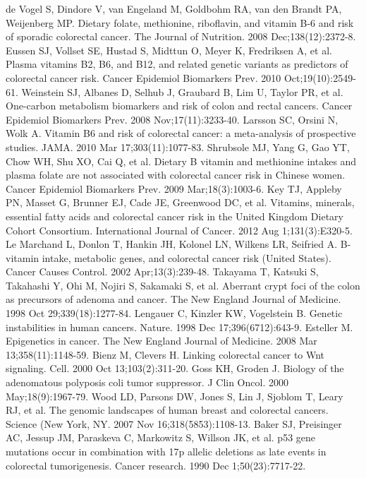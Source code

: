 \begin{thebibliography}{12}
		de Vogel S, Dindore V, van Engeland M, Goldbohm RA, van den Brandt PA, Weijenberg MP. Dietary folate, methionine, riboflavin, and vitamin B-6 and risk of sporadic colorectal cancer. The Journal of Nutrition. 2008 Dec;138(12):2372-8. 
		Eussen SJ, Vollset SE, Hustad S, Midttun O, Meyer K, Fredriksen A, et al. Plasma vitamins B2, B6, and B12, and related genetic variants as predictors of colorectal cancer risk. Cancer Epidemiol Biomarkers Prev. 2010 Oct;19(10):2549-61. 
		Weinstein SJ, Albanes D, Selhub J, Graubard B, Lim U, Taylor PR, et al. One-carbon metabolism biomarkers and risk of colon and rectal cancers. Cancer Epidemiol Biomarkers Prev. 2008 Nov;17(11):3233-40. 
		Larsson SC, Orsini N, Wolk A. Vitamin B6 and risk of colorectal cancer: a meta-analysis of prospective studies. JAMA. 2010 Mar 17;303(11):1077-83. 
		Shrubsole MJ, Yang G, Gao YT, Chow WH, Shu XO, Cai Q, et al. Dietary B vitamin and methionine intakes and plasma folate are not associated with colorectal cancer risk in Chinese women. Cancer Epidemiol Biomarkers Prev. 2009 Mar;18(3):1003-6. 
		Key TJ, Appleby PN, Masset G, Brunner EJ, Cade JE, Greenwood DC, et al. Vitamins, minerals, essential fatty acids and colorectal cancer risk in the United Kingdom Dietary Cohort Consortium. International Journal of Cancer. 2012 Aug 1;131(3):E320-5. 
		Le Marchand L, Donlon T, Hankin JH, Kolonel LN, Wilkens LR, Seifried A. B-vitamin intake, metabolic genes, and colorectal cancer risk (United States). Cancer Causes Control. 2002 Apr;13(3):239-48. 
		Takayama T, Katsuki S, Takahashi Y, Ohi M, Nojiri S, Sakamaki S, et al. Aberrant crypt foci of the colon as precursors of adenoma and cancer. The New England Journal of Medicine. 1998 Oct 29;339(18):1277-84. 
		Lengauer C, Kinzler KW, Vogelstein B. Genetic instabilities in human cancers. Nature. 1998 Dec 17;396(6712):643-9. 
		Esteller M. Epigenetics in cancer. The New England Journal of Medicine. 2008 Mar 13;358(11):1148-59. 
		Bienz M, Clevers H. Linking colorectal cancer to Wnt signaling. Cell. 2000 Oct 13;103(2):311-20. 
		Goss KH, Groden J. Biology of the adenomatous polyposis coli tumor suppressor. J Clin Oncol. 2000 May;18(9):1967-79. 
		Wood LD, Parsons DW, Jones S, Lin J, Sjoblom T, Leary RJ, et al. The genomic landscapes of human breast and colorectal cancers. Science (New York, NY. 2007 Nov 16;318(5853):1108-13. 
		Baker SJ, Preisinger AC, Jessup JM, Paraskeva C, Markowitz S, Willson JK, et al. p53 gene mutations occur in combination with 17p allelic deletions as late events in colorectal tumorigenesis. Cancer research. 1990 Dec 1;50(23):7717-22. 

\end{thebibliography}

